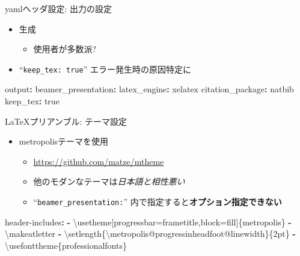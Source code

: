 \documentclass[
  12pt,
  ignorenonframetext,
]{beamer}
\newenvironment{Shaded}{\begin{snugshade}}{\end{snugshade}}
\newcommand{\AttributeTok}[1]{\textcolor[rgb]{0.77,0.63,0.00}{#1}}
\newcommand{\CharTok}[1]{\textcolor[rgb]{0.31,0.60,0.02}{#1}}
\newcommand{\FunctionTok}[1]{\textcolor[rgb]{0.00,0.00,0.00}{#1}}
\newcommand{\KeywordTok}[1]{\textcolor[rgb]{0.13,0.29,0.53}{\textbf{#1}}}
\providecommand{\tightlist}{%
  \setlength{\itemsep}{0pt}\setlength{\parskip}{0pt}}
\begin{document}
\begin{frame}[fragile]{yamlヘッダ設定: 出力の設定}
\protect\hypertarget{yamlux30d8ux30c3ux30c0ux8a2dux5b9a-ux51faux529bux306eux8a2dux5b9a}{}

\begin{itemize}
\tightlist
\item
  \XeLaTeX 生成

  \begin{itemize}
  \tightlist
  \item
    \LuaLaTeX 使用者が多数派?
  \end{itemize}
\item
  ``\texttt{keep\_tex:\ true}'' エラー発生時の原因特定に
\end{itemize}

\begin{Shaded}
\begin{Highlighting}[]
\FunctionTok{output}\KeywordTok{:}
\AttributeTok{  }\FunctionTok{beamer_presentation}\KeywordTok{:}
\AttributeTok{    }\FunctionTok{latex_engine}\KeywordTok{:}\AttributeTok{ xelatex}
\AttributeTok{    }\FunctionTok{citation_package}\KeywordTok{:}\AttributeTok{ natbib}
\AttributeTok{    }\FunctionTok{keep_tex}\KeywordTok{:}\AttributeTok{ }\CharTok{true}
\end{Highlighting}
\end{Shaded}

\end{frame}

\begin{frame}[fragile]{\LaTeX プリアンブル: テーマ設定}
\protect\hypertarget{ux30d7ux30eaux30a2ux30f3ux30d6ux30eb-ux30c6ux30fcux30deux8a2dux5b9a}{}

\begin{itemize}
\tightlist
\item
  metropolisテーマを使用

  \begin{itemize}
  \tightlist
  \item
    \url{https://github.com/matze/mtheme}
  \item
    他のモダンなテーマは\emph{日本語と相性悪い}
  \item
    ``\texttt{beamer\_presentation:}''
    内で指定すると\textbf{オプション指定できない}
  \end{itemize}
\end{itemize}

\begin{Shaded}
\begin{Highlighting}[]
\FunctionTok{header-includes}\KeywordTok{:}
\AttributeTok{  }\KeywordTok{-}\AttributeTok{ \textbackslash{}usetheme[progressbar=frametitle,block=fill]\{metropolis\}}
\AttributeTok{  }\KeywordTok{-}\AttributeTok{ \textbackslash{}makeatletter}
\AttributeTok{  }\KeywordTok{-}\AttributeTok{ \textbackslash{}setlength\{\textbackslash{}metropolis@progressinheadfoot@linewidth\}\{2pt\}}
\AttributeTok{  }\KeywordTok{-}\AttributeTok{ \textbackslash{}usefonttheme\{professionalfonts\}}
\end{Highlighting}
\end{Shaded}

\end{frame}
\end{document}
